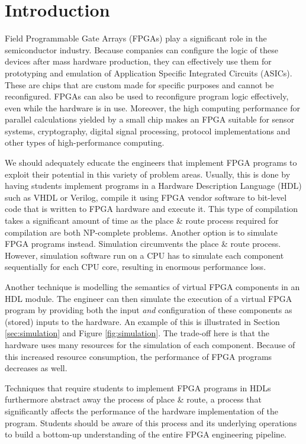\chapter{Introduction}
Field Programmable Gate Arrays (FPGAs) play a significant role in the semiconductor industry. Because companies can configure the logic of these devices after mass hardware production, they can effectively use them for prototyping and emulation of Application Specific Integrated Circuits (ASICs). These are chips that are custom made for specific purposes and cannot be reconfigured. FPGAs can also be used to reconfigure program logic effectively, even while the hardware is in use. Moreover, the high computing performance for parallel calculations yielded by a small chip makes an FPGA suitable for sensor systems\cite{Garcia20146247}, cryptography\cite{Yalla2009225, Nawari2015, Ikram2020172}, digital signal processing\cite{4566369}, protocol implementations\cite{Saha2014} and other types of high-performance computing\cite{Kanazawa2010}.

We should adequately educate the engineers that implement FPGA programs to exploit their potential in this variety of problem areas. Usually, this is done by having students implement programs in a Hardware Description Language (HDL) such as VHDL or Verilog, compile it using FPGA vendor software to bit-level code that is written to FPGA hardware and execute it. This type of compilation takes a significant amount of time as the place \& route process required for compilation are both NP-complete problems\cite{1585279}. Another option is to simulate FPGA programs instead. Simulation circumvents the place \& route process. However, simulation software run on a CPU has to simulate each component sequentially for each CPU core, resulting in enormous performance loss. 

Another technique is modelling the semantics of virtual FPGA components in an HDL module. The engineer can then simulate the execution of a virtual FPGA program by providing both the input \textit{and} configuration of these components as (stored) inputs to the hardware. An example of this is illustrated in Section \ref{sec:simulation} and Figure \ref{fig:simulation}. The trade-off here is that the hardware uses many resources for the simulation of each component. Because of this increased resource consumption, the performance of FPGA programs decreases as well.


Techniques that require students to implement FPGA programs in HDLs furthermore abstract away the process of place \& route, a process that significantly affects the performance of the hardware implementation of the program. Students should be aware of this process and its underlying operations to build a bottom-up understanding of the entire FPGA engineering pipeline.

